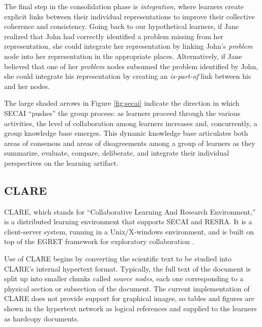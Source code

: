The final step in the consolidation phase is {\it integration}, where
learners create explicit links between their individual representations to
improve their collective coherence and consistency. Going back to our
hypothetical learners, if Jane realized that John had correctly identified
a problem missing from her representation, she could integrate her
representation by linking John's {\em problem} node into her representation
in the appropriate places.  Alternatively, if Jane believed that one of her
{\em problem} nodes subsumed the problem identified by John, she could
integrate his representation by creating an {\em is-part-of} link between
his and her nodes.

The large shaded arrows in Figure \ref{fig:secai} indicate the direction in
which SECAI ``pushes'' the group process: as learners proceed through the
various activities, the level of collaboration among learners increases
and, concurrently, a group knowledge base emerges.  This dynamic knowledge
base articulates both areas of consensus and areas of disagreements among a
group of learners as they summarize, evaluate, compare, deliberate, and
integrate their individual perspectives on the learning artifact.

\begin{figure*}[htb]
  \centerline{}
  \label{fig:secai}
\end{figure*}


\subsection{CLARE}
\label{sec:clare}

CLARE, which stands for ``Collaborative Learning And Research
Environment,'' is a distributed learning environment that supports SECAI
and RESRA.  It is a client-server system, running in a Unix/X-windows
environment, and is built on top of the EGRET framework for exploratory
collaboration \cite{csdl-92-01,csdl-93-09}.

Use of CLARE begins by converting the scientific text to be studied into
CLARE's internal hypertext format. Typically, the full text of the document
is split up into smaller chunks called {\it source nodes\/}, each one
corresponding to a physical section or subsection of the document. The
current implementation of CLARE does not provide support for graphical
images, so tables and figures are shown in the hypertext network as logical
references and supplied to the learners as hardcopy documents.

